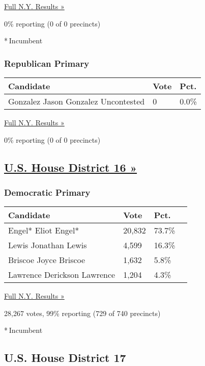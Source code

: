 \href{https://www.nytimes3xbfgragh.onion/elections/results/new-york}{Full
N.Y. Results »}

0\% reporting (0 of 0 precincts)

* Incumbent

\hypertarget{republican-primary-11}{%
\subsubsection{Republican Primary}\label{republican-primary-11}}

\begin{longtable}[]{@{}lll@{}}
\toprule
Candidate & Vote & Pct.\tabularnewline
\midrule
\endhead
 Gonzalez Jason Gonzalez Uncontested & 0 & 0.0\%\tabularnewline
\bottomrule
\end{longtable}

\href{https://www.nytimes3xbfgragh.onion/elections/results/new-york}{Full
N.Y. Results »}

0\% reporting (0 of 0 precincts)

\hypertarget{us-house-district-16-}{%
\subsection{\texorpdfstring{\href{https://www.nytimes3xbfgragh.onion/elections/results/new-york-house-district-16-primary-election}{U.S.
House District 16
»}}{U.S. House District 16 »}}\label{us-house-district-16-}}

\hypertarget{democratic-primary-16}{%
\subsubsection{Democratic Primary}\label{democratic-primary-16}}

\begin{longtable}[]{@{}llll@{}}
\toprule
Candidate & Vote & Pct. &\tabularnewline
\midrule
\endhead
 Engel* Eliot Engel* & 20,832 & 73.7\% &\tabularnewline
 Lewis Jonathan Lewis & 4,599 & 16.3\% &\tabularnewline
 Briscoe Joyce Briscoe & 1,632 & 5.8\% &\tabularnewline
 Lawrence Derickson Lawrence & 1,204 & 4.3\% &\tabularnewline
\bottomrule
\end{longtable}

\href{https://www.nytimes3xbfgragh.onion/elections/results/new-york}{Full
N.Y. Results »}

28,267 votes, 99\% reporting (729 of 740 precincts)

* Incumbent

\hypertarget{us-house-district-17}{%
\subsection{U.S. House District 17}\label{us-house-district-17}}

